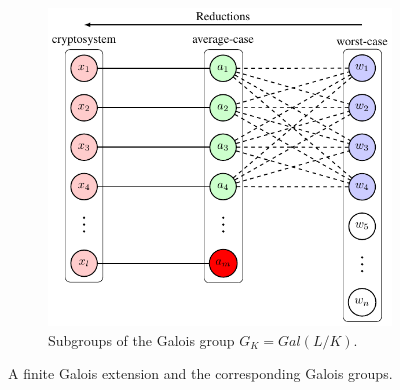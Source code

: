 \documentclass[../main.tex]{subfiles}
\begin{document}
\begin{figure}[ht]
\begin{subfigure}[t]{0.45\textwidth}
		\includegraphics[page=11]{images/Lattice_crypto_tikz_folder.pdf}
		\caption{Subgroups of the Galois group $G_K=Gal(L/K)$.}
		\label{subfig:subgroups of galois group}
	\end{subfigure}
	\caption{A finite Galois extension and the corresponding Galois groups.}
	\label{fig:galois ext and groups example1}
\end{figure}
\end{document}
